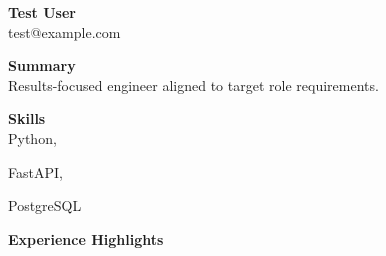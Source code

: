 \documentclass[11pt]{article}
\begin{document}
{\LARGE \textbf{ Test User }}\\
test@example.com  

\vspace{8pt}
\textbf{Summary}\\
Results-focused engineer aligned to target role requirements.

\vspace{8pt}
\textbf{Skills}\\

Python, 

FastAPI, 

PostgreSQL


\vspace{8pt}
\textbf{Experience Highlights}
\begin{itemize}

\end{itemize}
\end{document}
